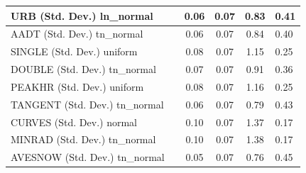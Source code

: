 \begin{table}
\begin{center}
\begin{tabular}{|l|l|c|c|c|l|}
			\hline
			URB (Std. Dev.) ln_normal &  & 0.06 & 0.07 & 0.83 & 0.41 \\
			\hline
			AADT (Std. Dev.) tn_normal &  & 0.06 & 0.07 & 0.84 & 0.40 \\
			\hline
			SINGLE (Std. Dev.) uniform &  & 0.08 & 0.07 & 1.15 & 0.25 \\
			\hline
			DOUBLE (Std. Dev.) tn_normal &  & 0.07 & 0.07 & 0.91 & 0.36 \\
			\hline
			PEAKHR (Std. Dev.) uniform &  & 0.08 & 0.07 & 1.16 & 0.25 \\
			\hline
			TANGENT (Std. Dev.) tn_normal &  & 0.06 & 0.07 & 0.79 & 0.43 \\
			\hline
			CURVES (Std. Dev.) normal &  & 0.10 & 0.07 & 1.37 & 0.17 \\
			\hline
			MINRAD (Std. Dev.) tn_normal &  & 0.10 & 0.07 & 1.38 & 0.17 \\
			\hline
			AVESNOW (Std. Dev.) tn_normal &  & 0.05 & 0.07 & 0.76 & 0.45 \\
			\hline
		\end{tabular}
	\end{center}
\end{table}